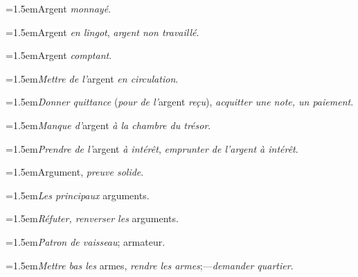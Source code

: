 \par{\dictfontsize\hangindent=1.5em\noindent Argent \textit{monnayé}. \par}
\par{\dictfontsize\hangindent=1.5em\noindent Argent \textit{en lingot}, \textit{argent non travaillé}. \par}
\par{\dictfontsize\hangindent=1.5em\noindent Argent \textit{comptant}. \par}
\par{\dictfontsize\hangindent=1.5em\noindent \textit{Mettre de l’}argent \textit{en circulation}. \par}
\par{\dictfontsize\hangindent=1.5em\noindent \textit{Donner quittance} (\textit{pour de l’}argent \textit{reçu}), \textit{acquitter une note, un paiement}. \par}
\par{\dictfontsize\hangindent=1.5em\noindent \textit{Manque d’}argent \textit{à la chambre du trésor}. \par}
\par{\dictfontsize\hangindent=1.5em\noindent \textit{Prendre de l’}argent \textit{à intérêt}, \textit{emprunter de l’argent à intérêt}. \par}
\par{\dictfontsize\hangindent=1.5em\noindent Argument, \textit{preuve solide}. \par}
\par{\dictfontsize\hangindent=1.5em\noindent \textit{Les principaux} arguments. \par}
\par{\dictfontsize\hangindent=1.5em\noindent \textit{Réfuter, renverser les} arguments. \par}
\par{\dictfontsize\hangindent=1.5em\noindent \textit{Patron de vaisseau}; armateur. \par}
\par{\dictfontsize\hangindent=1.5em\noindent \textit{Mettre bas les} armes, \textit{rendre les armes};—\textit{demander quartier}. \par}
